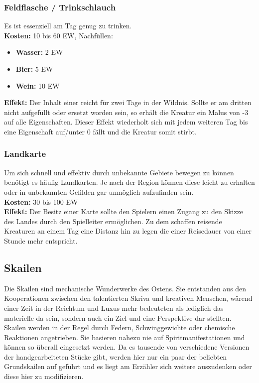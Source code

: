 \subsubsection*{Feldflasche / Trinkschlauch} \label{ar:feldflaschetrinkschlauch}
Es ist essenziell am Tag genug zu trinken. \\
\textbf{Kosten:} 10 bis 60 EW, Nachfüllen:
\begin{itemize}
    \item \textbf{Wasser:} 2 EW
    \item \textbf{Bier:} 5 EW
    \item \textbf{Wein:} 10 EW
\end{itemize}
\textbf{Effekt:} Der Inhalt einer  reicht für zwei Tage in der Wildnis. Sollte er am dritten nicht aufgefüllt oder ersetzt worden sein, so erhält die Kreatur ein Malus von -3 auf alle Eigenschaften. Dieser Effekt wiederholt sich mit jedem weiteren Tag bis eine Eigenschaft auf/unter 0 fällt und die Kreatur somit stirbt.

\subsubsection*{Landkarte}
Um sich schnell und effektiv durch unbekannte Gebiete bewegen zu können benötigt es häufig Landkarten. Je nach der Region können diese leicht zu erhalten oder in unbekannten Gefilden gar unmöglich aufzufinden sein. \\
\textbf{Kosten:} 30 bis 100 EW \\
\textbf{Effekt:} Der Besitz einer Karte sollte den Spielern einen Zugang zu den Skizze des Landes durch den Spielleiter ermöglichen. Zu dem schaffen reisende Kreaturen an einem Tag eine Distanz hin zu legen die einer Reisedauer von einer Stunde mehr entspricht.

\subsection*{Skailen}
Die Skailen sind mechanische Wunderwerke des Ostens. Sie entstanden aus den Kooperationen zwischen den talentierten Skriva und kreativen Menschen, wärend einer Zeit in der Reichtum und Luxus mehr bedeuteten als lediglich das materielle da sein, sondern auch ein Ziel und eine Perspektive dar stellten. Skailen werden in der Regel durch Federn, Schwinggewichte oder chemische Reaktionen angetrieben. Sie basieren nahezu nie auf Spiritmanifestationen und können so überall eingesetzt werden. Da es tausende von verschiedene Versionen der handgearbeiteten Stücke gibt, werden hier nur ein paar der beliebten Grundskailen auf geführt und es liegt am Erzähler sich weitere auszudenken oder diese hier zu modifizieren.

